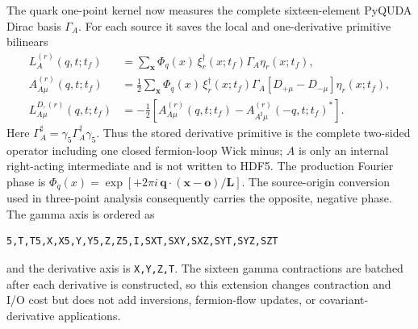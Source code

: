\documentclass[11pt,a4paper]{article}
\newcommand{\code}[1]{\texttt{\begingroup\def\_{\textunderscore\allowbreak}#1\endgroup}}
\newcommand{\Tf}{t_f}
\begin{document}
The quark one-point kernel now measures the complete sixteen-element PyQUDA
Dirac basis \(\Gamma_A\).  For each source it saves the local and
one-derivative primitive bilinears
\begin{align}
  L_A^{(r)}(q,t;\Tf)
  &=\sum_{\mathbf{x}}\Phi_q(x)\,
    \xi_r^\dagger(x;\Tf)\Gamma_A\eta_r(x;\Tf),
  \\
  A_{A\mu}^{(r)}(q,t;\Tf)
  &=\frac12\sum_{\mathbf{x}}\Phi_q(x)\,
    \xi_r^\dagger(x;\Tf)\Gamma_A
    [D_{+\mu}-D_{-\mu}]\eta_r(x;\Tf),
  \\
  L_{A\mu}^{D,(r)}(q,t;\Tf)
  &=-\frac12\left[
    A_{A\mu}^{(r)}(q,t;\Tf)
    -A_{A^\sharp\mu}^{(r)}(-q,t;\Tf)^*\right].
  \label{eq:primitive_bilinears}
\end{align}
Here \(\Gamma_A^\sharp=\gamma_5\Gamma_A^\dagger\gamma_5\).  Thus the stored
derivative primitive is the complete two-sided operator including one closed
fermion-loop Wick minus; \(A\) is only an internal right-acting intermediate
and is not written to HDF5.  The production Fourier phase is
\(\Phi_q(x)=\exp[+2\pi i\,\mathbf q\cdot(\mathbf x-\mathbf o)/\mathbf L]\).
The source-origin conversion used in three-point analysis consequently carries
the opposite, negative phase.
The gamma axis is ordered as
\begin{verbatim}
5,T,T5,X,X5,Y,Y5,Z,Z5,I,SXT,SXY,SXZ,SYT,SYZ,SZT
\end{verbatim}
and the derivative axis is \code{X,Y,Z,T}.  The sixteen gamma contractions are
batched after each derivative is constructed, so this extension changes
contraction and I/O cost but does not add inversions, fermion-flow updates, or
covariant-derivative applications.
\end{document}
